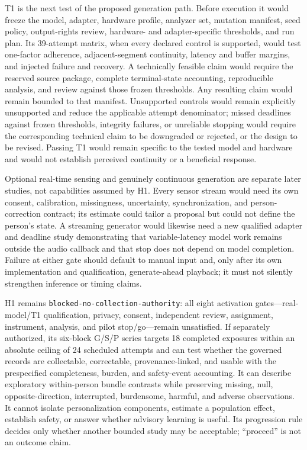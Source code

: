 T1 is the next test of the proposed generation path. Before execution it would
freeze the model, adapter, hardware profile, analyzer set, mutation manifest,
seed policy, output-rights review, hardware- and adapter-specific thresholds,
and run plan.
Its 39-attempt matrix, when every declared control is supported, would test
one-factor adherence, adjacent-segment continuity, latency and buffer margins,
and injected failure and recovery. A technically feasible claim would require
the reserved source package, complete terminal-state accounting, reproducible
analysis, and review against those frozen thresholds. Any resulting claim
would remain bounded to that manifest. Unsupported controls would remain
explicitly unsupported and reduce the applicable attempt denominator; missed
deadlines against frozen thresholds, integrity failures, or unreliable stopping
would require the corresponding technical claim to be downgraded or rejected,
or the design to be revised. Passing T1 would remain specific to the tested
model and hardware and would not establish perceived continuity or a beneficial
response.

Optional real-time sensing and genuinely continuous generation are separate
later studies, not capabilities assumed by H1. Every sensor stream would need
its own consent, calibration, missingness, uncertainty, synchronization, and
person-correction contract; its estimate could tailor a proposal but could not
define the person's state. A streaming generator would likewise need a new
qualified adapter and deadline study demonstrating that variable-latency model
work remains outside the audio callback and that stop does not depend on model
completion. Failure at either gate should default to manual input and, only
after its own implementation and qualification, generate-ahead playback; it
must not silently strengthen inference or timing claims.

H1 remains \texttt{blocked-no-collection-authority}: all eight activation
gates---real-model/T1 qualification, privacy, consent, independent review,
assignment, instrument, analysis, and pilot stop/go---remain unsatisfied. If
separately authorized, its six-block G/S/P series targets 18 completed exposures
within an absolute ceiling of 24 scheduled attempts and can test whether the
governed records are collectable, correctable, provenance-linked, and usable
with the prespecified completeness, burden, and safety-event accounting. It can
describe exploratory within-person bundle contrasts while preserving missing,
null, opposite-direction, interrupted, burdensome, harmful, and adverse
observations. It cannot isolate personalization components, estimate a
population effect, establish safety, or answer whether advisory learning is
useful. Its progression rule decides only whether another bounded study may be
acceptable; ``proceed'' is not an outcome claim.


